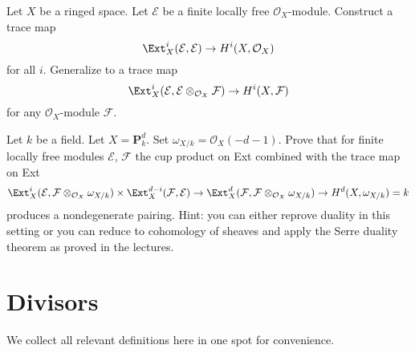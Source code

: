 \begin{exercise}
\label{exercise-trace-on-ext}
Let $X$ be a ringed space. Let $\mathcal{E}$ be a finite locally free
$\mathcal{O}_X$-module. Construct a trace map
$$
\Ext^i_X(\mathcal{E}, \mathcal{E}) \to H^i(X, \mathcal{O}_X)
$$
for all $i$. Generalize to a trace map
$$
\Ext^i_X(\mathcal{E}, \mathcal{E} \otimes_{\mathcal{O}_X} \mathcal{F})
\to H^i(X, \mathcal{F})
$$
for any $\mathcal{O}_X$-module $\mathcal{F}$.
\end{exercise}

\begin{exercise}
\label{exercise-duality}
Let $k$ be a field. Let $X = \mathbf{P}^d_k$. Set
$\omega_{X/k} = \mathcal{O}_X(-d - 1)$.
Prove that for finite locally free modules
$\mathcal{E}$, $\mathcal{F}$ the cup product on Ext
combined with the trace map on Ext
$$
\Ext^i_X(\mathcal{E}, \mathcal{F} \otimes_{\mathcal{O}_X} \omega_{X/k})
\times
\Ext^{d - i}_X(\mathcal{F}, \mathcal{E})
\to
\Ext_X^d(\mathcal{F}, \mathcal{F} \otimes_{\mathcal{O}_X} \omega_{X/k})
\to
H^d(X, \omega_{X/k}) = k
$$
produces a nondegenerate pairing. Hint: you can either reprove duality
in this setting or you can reduce to cohomology of sheaves and apply the
Serre duality theorem as proved in the lectures.
\end{exercise}







\section{Divisors}
\label{section-divisors}

\noindent
We collect all relevant definitions here in one spot for convenience.

